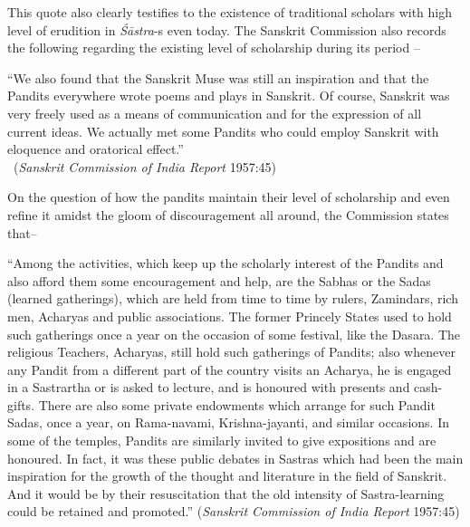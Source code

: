 This quote also clearly testifies to the existence of traditional scholars with high level of erudition in {\sl Śāstra}-s even today. The Sanskrit Commission also records the following regarding the existing level of scholarship during its period – 
\begin{myquote}
\eleven
“We also found that the Sanskrit Muse was still an inspiration and that the Pandits everywhere wrote poems and plays in Sanskrit. Of course, Sanskrit was very freely used as a means of communication and for the expression of all current ideas. We actually met some Pandits who could employ Sanskrit with eloquence and oratorical effect.”\\[-15pt]

~\hfill({\sl Sanskrit Commission of India Report} 1957:45)
\end{myquote}
\newpage

On the question of how the pandits maintain their level of scholarship and even refine it amidst the gloom of discouragement all around, the Commission states that– 
\begin{myquote}
\eleven
“Among the activities, which keep up the scholarly interest of the Pandits and also afford them some encouragement and help, are the Sabhas or the Sadas (learned gatherings), which are held from time to time by rulers, Zamindars, rich men, Acharyas and public associations. The former Princely States used to hold such gatherings once a year on the occasion of some festival, like the Dasara. The religious Teachers, Acharyas, still hold such gatherings of Pandits; also whenever any Pandit from a different part of the country visits an Acharya, he is engaged in a Sastrartha or is asked to lecture, and is honoured with presents and cash-gifts. There are also some private endowments which arrange for such Pandit Sadas, once a year, on Rama-navami, Krishna-jayanti, and similar occasions. In some of the temples, Pandits are similarly invited to give expositions and are honoured. In fact, it was these public debates in Sastras which had been the main inspiration for the growth of the thought and literature in the field of Sanskrit. And it would be by their resuscitation that the old intensity of Sastra-learning could be retained and promoted.” \hfill ({\sl Sanskrit Commission of India Report} 1957:45)
\end{myquote}

